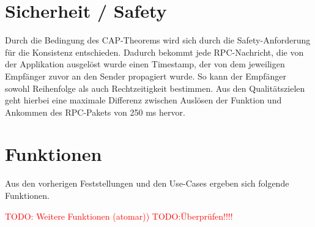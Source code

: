 
\section*{Sicherheit / Safety}

Durch die Bedingung des CAP-Theorems wird sich durch die Safety-Anforderung für die Konsistenz entschieden.
Dadurch bekommt jede RPC-Nachricht, die von der Applikation ausgelöst wurde einen Timestamp, der von dem jeweiligen Empfänger zuvor an den Sender propagiert wurde. So kann der Empfänger sowohl Reihenfolge als auch Rechtzeitigkeit bestimmen. Aus den Qualitätszielen geht hierbei eine maximale Differenz zwischen Auslösen der Funktion und Ankommen des RPC-Pakets von 250 ms hervor.
	

\section{Funktionen}
Aus den vorherigen Feststellungen und den Use-Cases ergeben sich folgende Funktionen.

\textcolor{red}{TODO: Weitere Funktionen (atomar))}
\textcolor{red}{TODO:Überprüfen!!!!}

